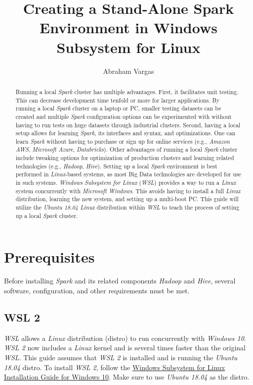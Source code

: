 \documentclass{article}
\begin{document}
\title{Creating a Stand-Alone Spark Environment in Windows Subsystem for Linux}
\author{Abraham Vargas}
\date{}
\maketitle

\begin{abstract}
Running a local \emph{Spark} cluster has multiple advantages. First, it facilitates unit testing.
This can decrease development time tenfold or more for larger applications. By running a
local \emph{Spark} cluster on a laptop or PC, smaller testing datasets can be created and multiple
\emph{Spark} configuration options can be experimented with without having to run tests on huge
datasets through industrial clusters. Second, having a local setup allows for learning
\emph{Spark}, its interfaces and syntax, and optimizations. One can learn \emph{Spark} without
having to purchase or sign up for online services (e.g., \emph{Amazon AWS}, \emph{Microsoft Azure},
\emph{Databricks}). Other advantages of running a local \emph{Spark} cluster include tweaking
options for optimization of production clusters and learning related technologies (e.g.,
\emph{Hadoop}, \emph{Hive}). Setting up a local \emph{Spark} environment is best performed in
\emph{Linux}-based systems, as most Big Data technologies are developed for use in such systems.
\emph{Windows Subsystem for Linux} (\emph{WSL}) provides a way to run a \emph{Linux} system
concurrently with \emph{Microsoft Windows}. This avoids having to install a full \emph{Linux}
distribution, learning the new system, and setting up a multi-boot PC. This guide will utilize
the \emph{Ubuntu 18.04 Linux} distribution within \emph{WSL} to teach the process of setting up a
local \emph{Spark} cluster.
\end{abstract}

\newpage
\tableofcontents
\newpage

\section{Prerequisites}
Before installing \emph{Spark} and its related components \emph{Hadoop} and \emph{Hive}, several
software, configuration, and other requirements must be met.

  \subsection{WSL 2}
  \emph{WSL} allows a \emph{Linux} distribution (distro) to run concurrently with \emph{Windows 10}.
  \emph{WSL 2} now includes a \emph{Linux} kernel and is several times faster than the original
  \emph{WSL}. This guide assumes that \emph{WSL 2} is installed and is running the
  \emph{Ubuntu 18.04} distro. To install \emph{WSL 2}, follow the
  \href{https://docs.microsoft.com/en-us/windows/wsl/install-win10}{Windows Subsystem
  for Linux Installation Guide for Windows 10}. Make sure to use \emph{Ubuntu 18.04} as the distro.
\end{document}
